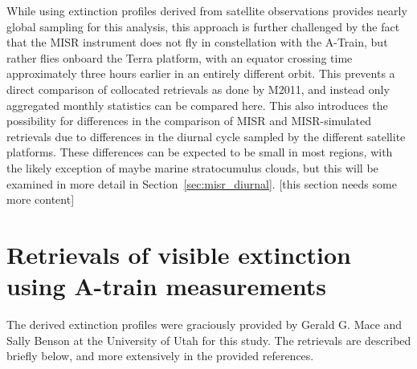 While using extinction profiles derived from satellite observations
provides nearly global sampling for this analysis, this approach is
further challenged by the fact that the MISR instrument does not fly in
constellation with the A-Train, but rather flies onboard the Terra
platform, with an equator crossing time approximately three hours
earlier in an entirely different orbit. This prevents a direct
comparison of collocated retrievals as done by M2011, and instead only
aggregated monthly statistics can be compared here. This also introduces
the possibility for differences in the comparison of MISR and
MISR-simulated retrievals due to differences in the diurnal cycle
sampled by the different satellite platforms. These differences can be
expected to be small in most regions, with the likely exception of maybe
marine stratocumulus clouds, but this will be examined in more detail in
Section~\ref{sec:misr_diurnal}. {[}this section needs some more
content{]}

\section{Retrievals of visible extinction using A-train
measurements}\label{sec:ccux5fretrievals}

The derived extinction profiles were graciously provided by Gerald G.
Mace and Sally Benson at the University of Utah for this study. The
retrievals are described briefly below, and more extensively in the
provided references.

